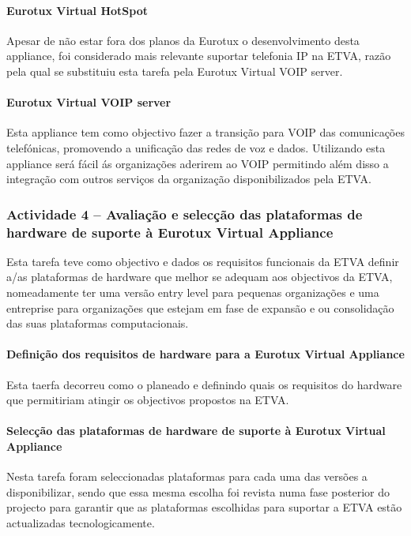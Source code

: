 \documentclass[a4paper,12pt,portugues]{article}
\begin{document}
\paragraph{Eurotux Virtual HotSpot}

Apesar de não estar fora dos planos da Eurotux o desenvolvimento desta
appliance, foi considerado mais relevante suportar telefonia IP na ETVA, razão
pela qual se substituiu esta tarefa pela Eurotux Virtual VOIP server.

\paragraph{Eurotux Virtual VOIP server}

Esta appliance tem como objectivo fazer a transição para VOIP das comunicações
telefónicas, promovendo a unificação das redes de voz e dados. Utilizando esta
appliance será fácil ás organizações aderirem ao VOIP permitindo além disso a
integração com outros serviços da organização disponibilizados pela ETVA.


\subsubsection{Actividade 4 – Avaliação e selecção das plataformas de hardware
de suporte à Eurotux Virtual Appliance}

Esta tarefa teve como objectivo e dados os requisitos funcionais da ETVA
definir a/as plataformas de hardware que melhor se adequam aos objectivos da
ETVA, nomeadamente ter uma versão entry level para pequenas organizações e uma
entreprise para organizações que estejam em fase de expansão e ou consolidação
das suas plataformas computacionais.

\paragraph{Definição dos requisitos de hardware para a Eurotux Virtual
Appliance}

Esta taerfa decorreu como o planeado e definindo quais os requisitos do hardware que permitiriam atingir os objectivos propostos na ETVA.

\paragraph{Selecção das plataformas de hardware de suporte à Eurotux Virtual Appliance}

Nesta tarefa foram seleccionadas plataformas para cada uma das versões a
disponibilizar, sendo que essa mesma escolha foi revista numa fase posterior
do projecto para garantir que as plataformas escolhidas para suportar a ETVA
estão actualizadas tecnologicamente.
\end{document}
